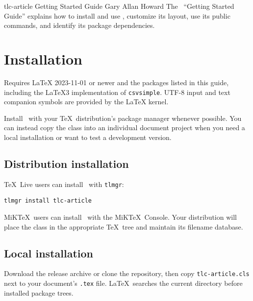 \documentclass[12pt]{tlc-article}
\begin{document}

\tlcTitlePageAndTableOfContents
  {tlc-article Getting Started Guide}
  {Gary Allan Howard}
  {The \tlcA\ ``Getting Started Guide'' explains how to install and use \tlcA,
   customize its layout, use its public commands, and identify its package
   dependencies.}


\section{Installation}
Requires \LaTeX{} 2023-11-01 or newer and the packages listed in this guide,
including the LaTeX3 implementation of \texttt{csvsimple}. UTF-8 input and
text companion symbols are provided by the \LaTeX{} kernel.

Install \tlcA\ with your \TeX\ distribution's package manager whenever
possible. You can instead copy the class into an individual document project
when you need a local installation or want to test a development version.


\subsection{Distribution installation}
\TeX\ Live users can install \tlcA\ with \texttt{tlmgr}:

\begin{lstlisting}[language=bash]
tlmgr install tlc-article
\end{lstlisting}

MiK\TeX\ users can install \tlcA\ with the MiK\TeX\ Console. Your distribution
will place the class in the appropriate \TeX\ tree and maintain its filename
database.


\subsection{Local installation}
Download the release archive or clone the repository, then copy
\texttt{tlc-article.cls} next to your document's \texttt{.tex} file. \LaTeX\
searches the current directory before installed package trees.
\end{document}
